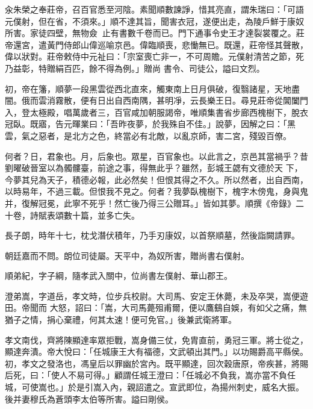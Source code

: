 \begin{pinyinscope}
 汆朱榮之奉莊帝，召百官悉至河陰。素聞順數諫諍，惜其亮直，謂朱瑞曰：「可語元僕射，但在省，不須來。」順不達其旨，聞害衣冠，遂便出走，為陵戶鮮于康奴所害。家徒四壁，無物僉，止有書數千卷而已。門下通事令史王才達裂裳覆之。莊帝還宮，遣黃門侍郎山偉巡喻京邑。偉臨順喪，悲慟無已。既還，莊帝怪其聲散，偉以狀對。莊帝敕侍中元祉曰：「宗室喪亡非一，不可周贍。元僕射清苦之節，死乃益彰，特贈絹百匹，餘不得為例。」贈尚
 書令、司徒公，謚曰文烈。



 初，帝在籓，順夢一段黑雲從西北直來，觸東南上日月俱破，復翳諸星，天地盡闇。俄而雲消霧散，便有日出自西南隅，甚明凈，云長樂王日。尋見莊帝從閶闔門入，登太極殿，唱萬歲者三，百官咸加朝服謁帝，唯順集書省步廊西槐樹下，脫衣冠臥。既寤，告元暉業曰：「吾昨夜夢，於我殊自不佳。」說夢，因解之曰：「黑雲，氣之惡者，是北方之色，終當必有北敵，以亂京師，害二宮，殘毀百僚。



 何者？日，君象也。月，后象也。眾星，百官象也。以此言之，京邑其當禍乎？昔劉曜破晉室以為髑髏臺，前途之事，得無此乎？雖然，彭城王勰有文德於天
 下，今夢其兒為天子，積德必報，此必然矣！但恨其得之不久。所以然者，出自西南，以時易年，不過三載。但恨我不見之。何者？我夢臥槐樹下，槐字木傍鬼，身與鬼并，復解冠冕，此寧不死乎！然亡後乃得三公贈耳。」皆如其夢。順撰《帝錄》二十卷，詩賦表頌數十篇，並多亡失。



 長子朗，時年十七，枕戈潛伏積年，乃手刃康奴，以首祭順墓，然後詣闕請罪。



 朝廷嘉而不問。朗位司徒屬。天平中，為奴所害，贈尚書右僕射。



 順弟紀，字子綱，隨孝武入關中，位尚書左僕射、華山郡王。



 澄弟嵩，字道岳，孝文時，位步兵校尉。大司馬、安定王休薨，未及卒哭，嵩便遊田。帝聞而
 大怒，詔曰：「嵩，大司馬薨殂甫爾，便以鷹鷂自娛，有如父之痛，無猶子之情，捐心棄禮，何其太速！便可免官。」後兼武衛將軍。



 孝文南伐，齊將陳顯達率眾拒戰，嵩身備三仗，免胄直前，勇冠三軍。將士從之，顯達奔潰。帝大悅曰：「任城康王大有福德，文武頓出其門。」以功賜爵高平縣侯。初，孝文之發洛也，馮皇后以罪幽於宮內。既平顯達，回次穀唐原，帝疾甚，將賜后死，曰：「使人不易可得。」顧謂任城王澄曰：「任城必不負我，嵩亦當不負任城，可使嵩也。」於是引嵩入內，親詔遣之。宣武即位，為揚州刺史，威名大振。後并妻穆氏為蒼頭李太伯等所害。謚曰剛侯。




\end{pinyinscope}
